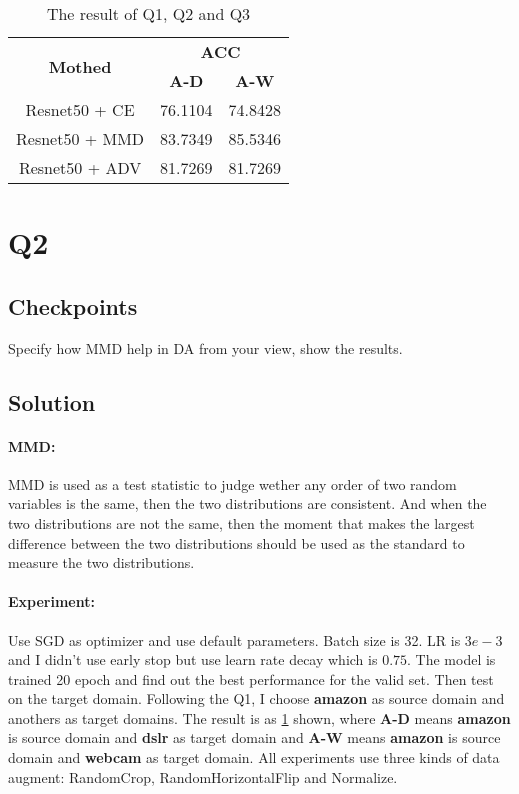 \documentclass[10pt,twocolumn,letterpaper]{article}
\begin{document}
\begin{table}[htbp]
    \centering
    \caption{The result of Q1, Q2 and Q3}
    \begin{tabular}{c|c|c}
        \hline
        \multirow{2}[4]{*}{\textbf{Mothed}}      & \multicolumn{2}{c}{\textbf{ACC}} \bigstrut                          \\
        \cline{2-3}                              & \textbf{A-D}                               & \textbf{A-W} \bigstrut \\
        \hline
        Resnet50 + CE\cite{targ2016resnet}            & 76.1104                                    & 74.8428 \bigstrut[t]   \\
        Resnet50 + MMD\cite{long2015learning}      & 83.7349                                    & 85.5346                \\
        Resnet50 + ADV\cite{ganin2015unsupervised} & 81.7269                                    & 81.7269 \bigstrut[b]   \\
        \hline
    \end{tabular}%
    \label{tab:result}%
\end{table}%
\section{Q2}
\subsection{Checkpoints}
Specify how MMD help in DA from your view, show the results.
\subsection{Solution}
\paragraph{MMD:}
MMD is used as a test statistic to judge wether any order of two random variables is the same, then the two distributions are consistent. And when the two distributions are not the same, then the moment that makes the largest difference between the two distributions should be used as the standard to measure the two distributions.
\paragraph{Experiment:}
Use SGD as optimizer and use default parameters. Batch size is 32. LR is $3e-3$ and I didn't use early stop but use learn rate decay which is $0.75$.
The model is trained 20 epoch and find out the best performance for the valid set. Then test on the target domain. Following the Q1, I choose \textbf{amazon} as source domain and anothers as target domains. The result is as \cref{tab:result} shown, where \textbf{A-D} means \textbf{amazon} is source domain and \textbf{dslr} as target domain and \textbf{A-W} means \textbf{amazon} is source domain and \textbf{webcam} as target domain. 
All experiments use three kinds of data augment: RandomCrop, RandomHorizontalFlip and Normalize.
\end{document}
